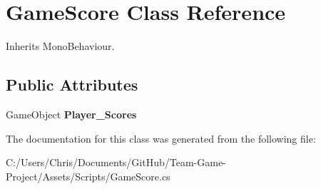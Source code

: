 \hypertarget{class_game_score}{}\section{Game\+Score Class Reference}
\label{class_game_score}


Inherits Mono\+Behaviour.

\subsection*{Public Attributes}
\begin{DoxyCompactItemize}
\item 
Game\+Object {\bfseries Player\+\_\+\+Scores}\hypertarget{class_game_score_a334a7bf1f71c7298207088b794ba3534}{}\label{class_game_score_a334a7bf1f71c7298207088b794ba3534}

\end{DoxyCompactItemize}


The documentation for this class was generated from the following file\+:\begin{DoxyCompactItemize}
\item 
C\+:/\+Users/\+Chris/\+Documents/\+Git\+Hub/\+Team-\/\+Game-\/\+Project/\+Assets/\+Scripts/Game\+Score.\+cs\end{DoxyCompactItemize}
